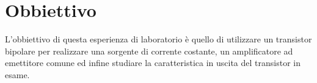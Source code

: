 \section*{Obbiettivo}

L'obbiettivo di questa esperienza di laboratorio è quello di utilizzare un transistor bipolare per realizzare una sorgente di corrente costante, un amplificatore ad emettitore comune ed infine studiare la caratteristica in uscita del transistor in esame. 
